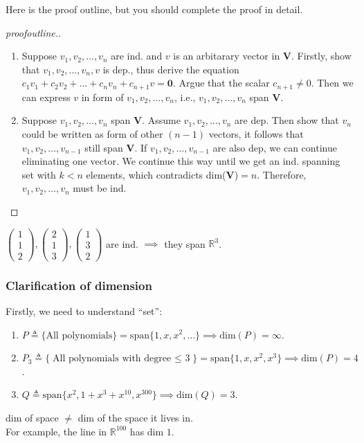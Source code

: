 Here is the proof outline, but you should complete the proof in detail.
\begin{proof}[proofoutline.]
\begin{enumerate}
\item
Suppose $v_1,v_2,\dots,v_n$ are ind. and $v$ is an arbitarary vector in $\bm V$. Firstly, show that $v_1,v_2,\dots,v_n,v$ is dep., thus derive the equation $c_1v_1+c_2v_2+\dots+c_{n}v_n+c_{n+1}v = \bm 0$. Argue that the scalar $c_{n+1}\ne 0$. Then we can express $v$ in form of $v_1,v_2,\dots,v_n$, i.e., $v_1,v_2,\dots,v_n$ span $\bm V$.
\item
Suppose $v_1,v_2,\dots,v_n$ span $\bm V$. Assume $v_1,v_2,\dots,v_n$ are dep. Then show that $v_n$ could be written as form of other $(n-1)$ vectors, it follows that $v_1,v_2,\dots,v_{n-1}$ still span $\bm V$. If $v_1,v_2,\dots,v_{n-1}$ are also dep, we can continue eliminating one vector. We continue this way until we get an ind. spanning set with $k<n$ elements, which contradicts dim($\bm V$)$=n$. Therefore, $v_1,v_2,\dots,v_n$ must be ind.
\end{enumerate}
\end{proof}
\begin{example}\label{span_dimension_three}
$\begin{pmatrix}
1\\1\\2
\end{pmatrix},\begin{pmatrix}
2\\1\\3
\end{pmatrix},\begin{pmatrix}
1\\3\\2
\end{pmatrix}$ are ind. $\implies$ they span $\mathbb{R}^{3}$.
\end{example}
\subsubsection{Clarification of dimension}
Firstly, we need to understand ``set'':
\begin{enumerate}
\item
$P\triangleq\{\text{All polynomials}\} = \text{span}\{1,x,x^2,\dots\}\implies \text{dim}(P)=\infty$.
\item
$P_3\triangleq\{\text{All polynomials with degree $\le$ 3}\} = \text{span}\{1,x,x^2,x^3\}\implies \text{dim}(P)=4$.
\item
$Q\triangleq\text{span}\{x^2,1+x^3+x^{10},x^{300}\}\implies \text{dim}(Q) = 3.$
\end{enumerate}
\begin{remark}
dim of space $\ne$ dim of the space it lives in.\\
For example, the line in $\mathbb{R}^{100}$ has dim $1$.
\end{remark}
